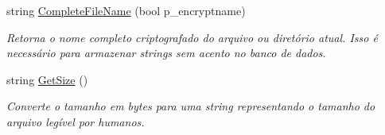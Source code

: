 \begin{DoxyCompactItemize}
string \hyperlink{classSpartacus_1_1Utils_1_1File_a9239b1a9abde390b7194b9906d5f7ec0}{Complete\+File\+Name} (bool p\+\_\+encryptname)
\begin{DoxyCompactList}\small\item\em Retorna o nome completo criptografado do arquivo ou diretório atual. Isso é necessário para armazenar strings sem acento no banco de dados. \end{DoxyCompactList}\item 
string \hyperlink{classSpartacus_1_1Utils_1_1File_a9038c8331fbab5e85f4b6bb607775b3c}{Get\+Size} ()
\begin{DoxyCompactList}\small\item\em Converte o tamanho em bytes para uma string representando o tamanho do arquivo legível por humanos. \end{DoxyCompactList}\end{DoxyCompactItemize}
